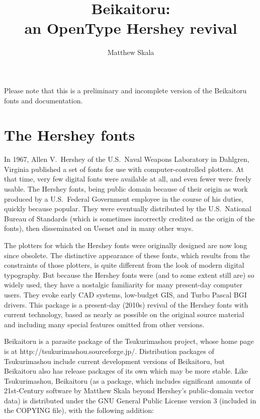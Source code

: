 \documentclass{article}
\title{Beikaitoru:\\an OpenType Hershey revival}
\author{Matthew Skala}
\begin{document}
\maketitle


Please note that this is a preliminary and incomplete version of the
Beikaitoru fonts and documentation.

\section{The Hershey fonts}

In 1967, Allen V.\ Hershey of the U.S.\ Naval Weapons Laboratory in
Dahlgren, Virginia published a set of fonts for use with computer-controlled
plotters.  At that time, very few digital fonts were available at all, and
even fewer were freely usable.  The Hershey fonts, being public domain
because of their origin as work produced by a U.S.\ Federal Government
employee in the course of his duties, quickly because popular.  They were
eventually distributed by the U.S.\ National Bureau of Standards (which is
sometimes incorrectly credited as the origin of the fonts), then
disseminated on Usenet and in many other ways.

The plotters for which the Hershey fonts were originally designed are now
long since obsolete.  The distinctive appearance of these fonts, which
results from the constraints of those plotters, is quite different from the
look of modern digital typography.  But because the Hershey fonts were (and
to some extent still are) so widely used, they have a nostalgic familiarity
for many present-day computer users.  They evoke early CAD systems,
low-budget GIS, and Turbo Pascal BGI drivers.  This package is a present-day
(2010s) revival of the Hershey fonts with current technology, based as
nearly as possible on the original source material and including many
special features omitted from other versions.

Beikaitoru is a parasite package of the Tsukurimashou project, whose home
page is at http://tsukurimashou.sourceforge.jp/.  Distribution packages of
Tsukurimashou include current development versions of Beikaitoru, but
Beikaitoru also has release packages of its own which may be more stable. 
Like Tsukurimashou, Beikaitoru (as a package, which includes significant
amounts of 21st-Century software by Matthew Skala beyond Hershey's
public-domain vector data) is distributed under the GNU General Public
License version 3 (included in the COPYING file), with the following
addition:
\end{document}
